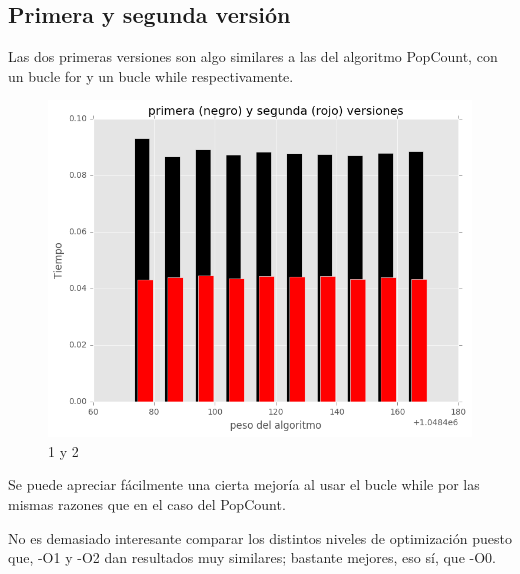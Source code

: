 \documentclass[a4paper, 11pt]{article}
\begin{document}
\subsection{Primera y segunda versión}
Las dos primeras versiones son algo similares a las del algoritmo PopCount, con un bucle for y un bucle while respectivamente.
\begin{figure}[!hbp]
	\includegraphics[scale=0.6]{1y2p.png}
	\caption{1 y 2	\label{1y2p}}
\end{figure} 

Se puede apreciar fácilmente una cierta mejoría al usar el bucle while por las mismas razones que en el caso del PopCount.

No es demasiado interesante comparar los distintos niveles de optimización puesto que, -O1 y -O2 dan resultados muy similares; bastante mejores, eso sí, que -O0.
\end{document}
